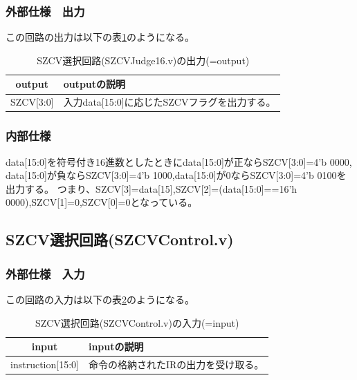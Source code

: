 \documentclass[a4j,titlepage]{jarticle}
\begin{document}
\subsubsection{外部仕様　出力}
この回路の出力は以下の表\ref{szcvjudgeO}のようになる。
\begin{table}[H]
    \caption{SZCV選択回路(SZCVJudge16.v)の出力(=output)}
    \label{szcvjudgeO}
    \begin{center}
    \begin {tabularx}{150mm}{|c|X|} \hline
         output & outputの説明 \\ \hline \hline
         SZCV[3:0] & 入力data[15:0]に応じたSZCVフラグを出力する。\\ \hline
    \end {tabularx}
    \end{center}
\end{table}

\subsubsection{内部仕様}
data[15:0]を符号付き16進数としたときにdata[15:0]が正ならSZCV[3:0]=4'b 0000,
data[15:0]が負ならSZCV[3:0]=4'b 1000,data[15:0]が0ならSZCV[3:0]=4'b 0100を出力する。
つまり、SZCV[3]=data[15],SZCV[2]=(data[15:0]==16'h 0000),SZCV[1]=0,SZCV[0]=0となっている。



\newpage
\subsection{SZCV選択回路(SZCVControl.v)}

\subsubsection{外部仕様　入力}
この回路の入力は以下の表\ref{szcvcontrolI}のようになる。
\begin{table}[H]
    \caption{SZCV選択回路(SZCVControl.v)の入力(=input)}
    \label{szcvcontrolI}
    \begin{center}
    \begin {tabularx}{150mm}{|c|X|} \hline
         input & inputの説明 \\ \hline \hline
         instruction[15:0] & 命令の格納されたIRの出力を受け取る。\\ \hline
    \end{tabularx}
    \end{center}
\end{table}
\end{document}
